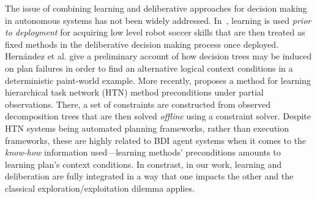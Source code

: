 The issue of combining learning and deliberative approaches for decision making
in autonomous systems has not been widely addressed.
In~\cite{Riedmiller01}, learning is used \emph{prior to deployment} for acquiring
low level robot soccer skills that are then treated as fixed methods in the
deliberative decision making process once deployed.
Hern\'andez et al. \cite{Hernandez04:Learning} give a preliminary account of how
decision trees may be induced on plan failures in order to find an alternative
logical context conditions in a deterministic paint-world example.
More recently, \cite{Zhuo09:Learning} proposes a method for learning hierarchical
task network (HTN) method preconditions under partial observations. There, a set
of  constraints are constructed from observed decomposition trees that are then
solved \emph{offline} using a constraint solver. Despite HTN systems being
automated planning frameworks, rather than execution frameworks, these are highly
related to BDI agent systems when it comes to the \emph{know-how} information
used---learning methods' preconditions amounts to learning plan's context
conditions.
In constrast, in our work, learning and deliberation are fully integrated in a
way that one impacts the other and the classical exploration/exploitation dilemma
applies.



